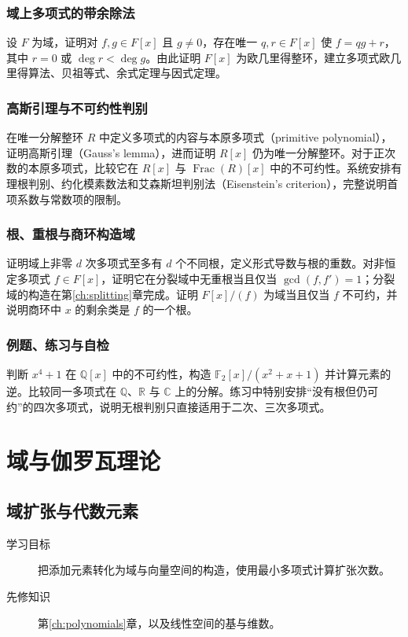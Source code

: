 \documentclass[UTF8,12pt,a4paper,fontset=fandol]{ctexbook}
\begin{document}
\section{域上多项式的带余除法}
设 $F$ 为域，证明对 $f,g\in F[x]$ 且 $g\ne0$，存在唯一 $q,r\in F[x]$ 使 $f=qg+r$，其中 $r=0$ 或 $\deg r<\deg g$。由此证明 $F[x]$ 为欧几里得整环，建立多项式欧几里得算法、贝祖等式、余式定理与因式定理。

\section{高斯引理与不可约性判别}
在唯一分解整环 $R$ 中定义多项式的内容与本原多项式（primitive polynomial），证明高斯引理（Gauss's lemma），进而证明 $R[x]$ 仍为唯一分解整环。对于正次数的本原多项式，比较它在 $R[x]$ 与 $\operatorname{Frac}(R)[x]$ 中的不可约性。系统安排有理根判别、约化模素数法和艾森斯坦判别法（Eisenstein's criterion），完整说明首项系数与常数项的限制。

\section{根、重根与商环构造域}
证明域上非零 $d$ 次多项式至多有 $d$ 个不同根，定义形式导数与根的重数。对非恒定多项式 $f\in F[x]$，证明它在分裂域中无重根当且仅当 $\gcd(f,f')=1$；分裂域的构造在第\ref{ch:splitting}章完成。证明 $F[x]/(f)$ 为域当且仅当 $f$ 不可约，并说明商环中 $x$ 的剩余类是 $f$ 的一个根。

\section{例题、练习与自检}
判断 $x^4+1$ 在 $\mathbb Q[x]$ 中的不可约性，构造 $\mathbb F_2[x]/(x^2+x+1)$ 并计算元素的逆。比较同一多项式在 $\mathbb Q$、$\mathbb R$ 与 $\mathbb C$ 上的分解。练习中特别安排“没有根但仍可约”的四次多项式，说明无根判别只直接适用于二次、三次多项式。

\part{域与伽罗瓦理论}

\chapter{域扩张与代数元素}\label{ch:extensions}

\begin{description}
  \item[学习目标] 把添加元素转化为域与向量空间的构造，使用最小多项式计算扩张次数。
  \item[先修知识] 第\ref{ch:polynomials}章，以及线性空间的基与维数。
\end{description}
\end{document}
